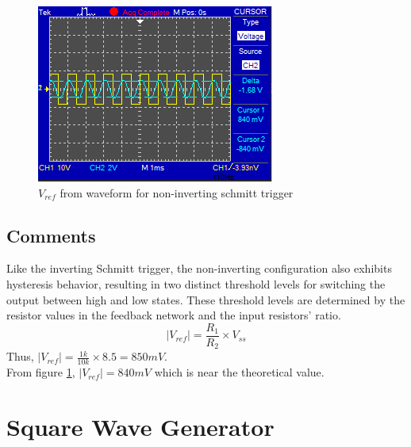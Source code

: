 \documentclass[a4paper, 12pt, english]{article}
\newlength{\simheight}
\begin{document}
\begin{figure}[H]
    \centering
    \includegraphics[width=\linewidth, height=\simheight]{images/Non-Inverting-Schmitt-Trigger-Vref-Cursor.png}
    \caption{$V_{ref}$ from waveform for non-inverting schmitt trigger}
    \label{fig:$V_{ref}$ from waveform for non-inverting schmitt trigger}
\end{figure}

\subsection{Comments}
Like the inverting Schmitt trigger, the non-inverting configuration also exhibits hysteresis behavior, resulting in two distinct threshold levels for switching the output between high and low states. These threshold levels are determined by the resistor values in the feedback network and the input resistors' ratio.
\[ |V_{ref}| = \frac{R_{1}}{R_{2}}  \times V_{ss}\]
Thus, \(|V_{ref}|=\frac{1k}{10k}\times8.5=850mV\). \\
From figure \ref{fig:$V_{ref}$ from waveform for non-inverting schmitt trigger}, $|V_{ref}|=840mV$ which is near the theoretical value.

\newpage

\section{Square Wave Generator}
\end{document}
